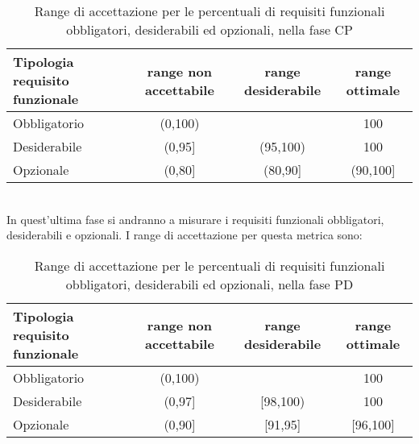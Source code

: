 \begin{description}
							\begin{table}[H]
								\centering
									\begin{tabu}{| l | c | c | c |}\hline
										Tipologia requisito funzionale	&	range non accettabile & range desiderabile & range ottimale \\ \hline	\hline

										Obbligatorio	&	(0,100) &  &  100 \\ \hline
										Desiderabile	&  (0,95]& (95,100) & 100 \\ \hline
										Opzionale		&  (0,80]& (80,90] & (90,100] \\ \hline
									\end{tabu}
									\caption{Range di accettazione per le percentuali di requisiti funzionali obbligatori, desiderabili ed opzionali, nella fase CP}
							\end{table}

						\item[\insphase{Fase PD}] \hfill \\
						In quest'ultima fase si andranno a misurare i requisiti funzionali obbligatori, desiderabili e opzionali. I range di accettazione per questa metrica sono:

						\begin{table}[H]
							\centering
								\begin{tabu}{| l | c | c | c |}\hline
									Tipologia requisito funzionale	&	range non accettabile & range desiderabile & range ottimale \\ \hline	\hline

									Obbligatorio	&	(0,100) &  &  100 \\ \hline
									Desiderabile	&  (0,97]& [98,100) & 100 \\ \hline
									Opzionale		&  (0,90]& [91,95] & [96,100] \\ \hline
								\end{tabu}
								\caption{Range di accettazione per le percentuali di requisiti funzionali obbligatori, desiderabili ed opzionali, nella fase PD}
						\end{table}
					\end{description}

